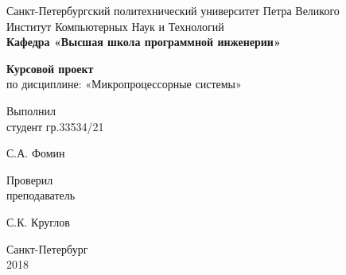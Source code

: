 \thispagestyle{empty}

\begin{center}
    Санкт-Петербургский политехнический университет Петра Великого\\
    Институт Компьютерных Наук и Технологий\\
    \bfseries{Кафедра «Высшая школа программной инженерии»}
\end{center}

\vspace{20ex}

\begin{center}
{
\LARGE \textbf{Курсовой проект} \\[3ex]
по дисциплине: «Микропроцессорные системы»
}
\end{center}

\vspace{40ex}

\noindent Выполнил\\
студент гр.33534/21\hfill
\begin{minipage}{0.7\textwidth}
    \hfill \uline{\hspace{3cm}} \hspace{1.1cm} С.А. Фомин
\end{minipage}

\vspace{3ex}

\noindent Проверил\\
преподаватель\hfill
\begin{minipage}{0.7\textwidth}
    \hfill \uline{\hspace{3cm}} \hspace{0.5cm} С.К. Круглов
\end{minipage}

\vspace{3ex}

\vfill

\begin{center}
    Санкт-Петербург\\
    2018
\end{center}

